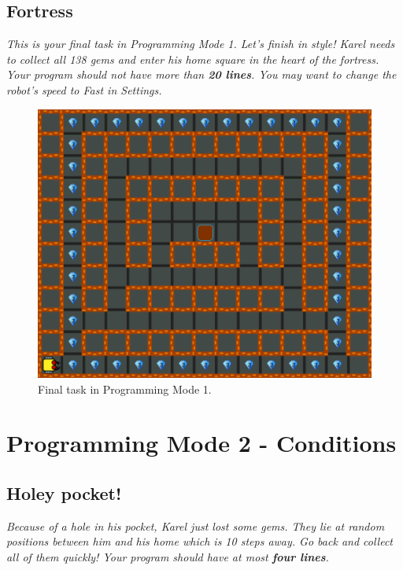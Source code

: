 \subsection{Fortress}

{\em This is your final task in Programming Mode 1. Let's finish in style! Karel needs to collect all 138 gems and enter his home square in the heart of the fortress. Your program should not have more than {\bf 20 lines}. You may want to change the robot's speed to Fast in Settings.}\\[-9mm]

\begin{figure}[!ht]
\begin{center}
\includegraphics[height=0.4\textwidth]{img/a28.png}
\end{center}
\vspace{-5mm}
\caption{Final task in Programming Mode 1.}
\label{fig:a28}
\vspace{-10mm}
\end{figure}


\setcounter{section}{6}
\section{Programming Mode 2 - Conditions}

\subsection{Holey pocket!}

{\em Because of a hole in his pocket, Karel just lost some gems. They lie at random positions between him and his home which is 10 steps away. Go back and collect all of them quickly! Your program should have at most {\bf four lines}.}\\[-9mm]

